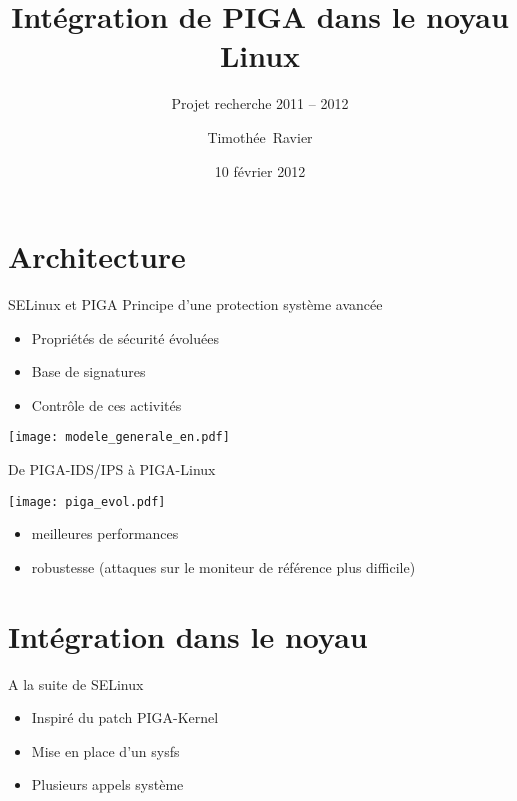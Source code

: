 \documentclass{beamer}
\title{\huge Intégration de PIGA dans le noyau Linux}
\subtitle{\Large Projet recherche 2011 -- 2012}
\author{\Large Timothée~Ravier}
\institute{ENSI de Bourges}
\date{10 février 2012}
\begin{document}
{
	\framenumberoff
	\watermarkoff
	\begin{frame}
	\titlepage
	\end{frame}
}

\section{Architecture}
\begin{frame}{SELinux et PIGA}
	Principe d'une protection système avancée
	\begin{itemize}
		\item Propriétés de sécurité évoluées
		\item Base de signatures
		\item Contrôle de ces activités
	\end{itemize}
	\vspace{-1cm}
	\hspace{1cm}
		\texttt{[image: modele\_generale\_en.pdf]}
\end{frame}

\begin{frame}{De PIGA-IDS/IPS à PIGA-Linux}
	\begin{center}
		\texttt{[image: piga\_evol.pdf]}
	\end{center}
	\vspace{-0.5cm}
	\begin{itemize}
		\item meilleures performances
		\item robustesse (attaques sur le moniteur de référence plus
difficile)
	\end{itemize}
\end{frame}

\section{Intégration dans le noyau}
\begin{frame}{A la suite de SELinux}
	\begin{itemize}
		\item Inspiré du patch PIGA-Kernel
		\item Mise en place d'un sysfs
		\item Plusieurs appels système
	\end{itemize}
\end{frame}
\end{document}
